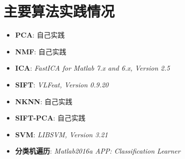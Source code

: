 \section{主要算法实践情况}
\begin{itemize}
	\item \textbf{PCA}: 自己实践
	\item \textbf{NMF}: 自己实践
	\item \textbf{ICA}: \textit{FastICA for Matlab 7.x and 6.x, Version 2.5}
	\item \textbf{SIFT}: \textit{VLFeat, Version 0.9.20}
	\item \textbf{NKNN}: 自己实践
	\item \textbf{SIFT-PCA}: 自己实践
	\item \textbf{SVM}: \textit{LIBSVM, Version 3.21}
	\item \textbf{分类机遍历}: \textit{Matlab2016a APP: Classification Learner}
\end{itemize}